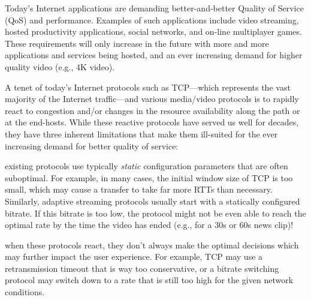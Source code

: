 


Today's Internet applications are demanding better-and-better Quality of Service (QoS) and performance. Examples of such applications include video streaming, hosted productivity applications, social networks, and on-line multiplayer games. These requirements will only increase in the future with more and more applications and services being hosted, and an ever increasing demand for higher quality video (e.g., 4K video).

A tenet of today's Internet protocols such as TCP---which represents the vast majority of the Internet traffic---and various media/video protocols is to rapidly react to congestion and/or changes in the resource availability along the path or at the end-hosts. While these reactive protocols have served us well for decades, they have three inherent limitations that make them ill-suited for the ever increasing demand for better quality of service: 

 existing protocols use typically \emph{static} configuration parameters that are often suboptimal. For example, in many cases, the initial window size of TCP is too small, which may cause a transfer to take far more RTTs than necessary. Similarly, adaptive streaming protocols usually start with a statically configured bitrate. If this bitrate is too low, the protocol might not be even able to reach the optimal rate by the time the video has ended (e.g., for a 30s or 60s news clip)!

 when these protocols react, they don't always make the optimal decisions which may further impact the user experience. For example, TCP may use a retransmission timeout that is way too conservative, or a bitrate switching protocol may switch down to a rate that is still too high for the given network conditions.

